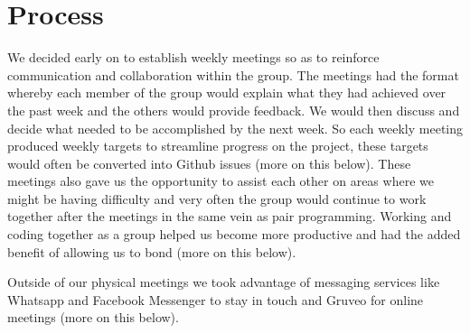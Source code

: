 \documentclass[a4paper]{report}
\begin{document}
	\section{Process}
	We decided early on to establish weekly meetings so as to reinforce communication and collaboration within the group. The meetings had the format whereby each member of the group would explain what they had achieved over the past week and the others would provide feedback. We would then discuss and decide what needed to be accomplished by the next week. So each weekly meeting produced weekly targets to streamline progress on the project, these targets would often be converted into Github issues (more on this below). These meetings also gave us the opportunity to assist each other on areas where we might be having difficulty and very often the group would continue to work together after the meetings in the same vein as pair programming. Working and coding together as a group helped us become more productive and had the added benefit of allowing us to bond (more on this below).\newline
	\par Outside of our physical meetings we took advantage of messaging services like Whatsapp and Facebook Messenger to stay in touch and Gruveo for online meetings (more on this below).
	
\end{document}
